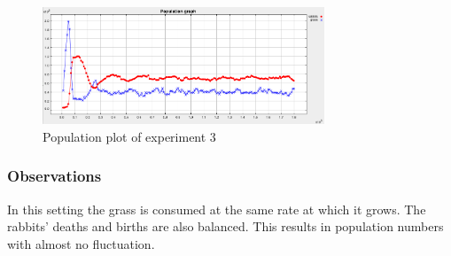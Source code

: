 \documentclass[11pt]{article}
\begin{document}
\begin{figure}[h]
  \caption{Population plot of experiment 3}
  \includegraphics[width=0.75\textwidth]{experiment3}
  \centering
\end{figure}

\subsubsection{Observations}
In this setting the grass is consumed at the same rate at which it grows. The
rabbits' deaths and births are also balanced. This results in population numbers
with almost no fluctuation.
\end{document}
